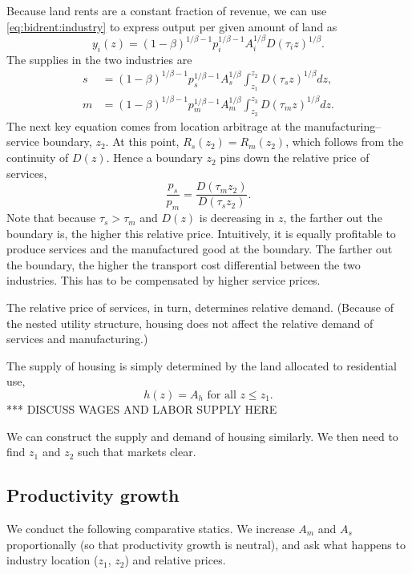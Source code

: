 \documentclass[12pt]{article}
\begin{document}
Because land rents are a constant fraction of revenue, we can use \eqref{eq:bidrent:industry} to express output per given amount of land as
\[
y_i(z) = (1-\beta)^{1/\beta-1} p_i^{1/\beta-1} A_i^{1/\beta} D(\tau_i z)^{1/\beta}.
\]
The supplies in the two industries are
\begin{align}
s &= (1-\beta)^{1/\beta-1} p_s^{1/\beta-1} A_s^{1/\beta} \int_{z_1}^{z_2}D(\tau_s z)^{1/\beta} dz,\label{eq:supply:s} \\
m&= (1-\beta)^{1/\beta-1} p_m^{1/\beta-1} A_m^{1/\beta} \int_{z_2}^{z_3}D(\tau_m z)^{1/\beta} dz.\label{eq:supply:m}
\end{align}
The next key equation comes from location arbitrage at the manufacturing--service boundary, $z_2$. At this point, $R_s(z_2)=R_m(z_2)$, which follows from the continuity of $D(z)$. Hence a boundary $z_2$ pins down the relative price of services,
\begin{equation}\label{eq:arbitrage}
\frac{p_s}{p_m} = \frac{D(\tau_m z_2)}{D(\tau_s z_2)}.
\end{equation}
Note that because $\tau_s>\tau_m$ and $D(z)$ is decreasing in $z$, the farther out the boundary is, the higher this relative price. Intuitively, it is equally profitable to produce services and the manufactured good at the boundary. The farther out the boundary, the higher the transport cost differential between the two industries. This has to be compensated by higher service prices.

The relative price of services, in turn, determines relative demand. (Because of the nested utility structure, housing does not affect the relative demand of services and manufacturing.)

The supply of housing is simply determined by the land allocated to residential use,
\[
h(z) = A_h\text{ for all }z\le z_1.
\]
*** DISCUSS WAGES AND LABOR SUPPLY HERE

We can construct the supply and demand of housing similarly. We then need to find $z_1$ and $z_2$ such that markets clear.

\subsection{Productivity growth}
We conduct the following comparative statics. We increase $A_m$ and $A_s$ proportionally (so that productivity growth is neutral), and ask what happens to industry location ($z_1$, $z_2$) and relative prices.
\end{document}
